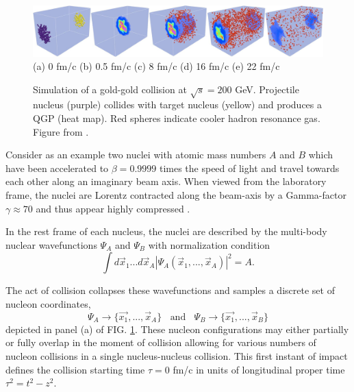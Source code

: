 \documentclass[aps,prc,reprint,amsmath,nofootinbib]{revtex4-1}
\begin{document}
\begin{figure}
  \centering
  \includegraphics[width=\textwidth]{evolution} \\
  (a) 0 fm/c   \hspace{.1\textwidth}
  (b) 0.5 fm/c \hspace{.1\textwidth}
  (c) 8 fm/c   \hspace{.1\textwidth}
  (d) 16 fm/c  \hspace{.1\textwidth}
  (e) 22 fm/c
  \caption{Simulation of a gold-gold collision at $\sqrt{s}=200$ GeV. Projectile nucleus (purple) collides with target nucleus (yellow) and produces a QGP (heat map). 
  Red spheres indicate cooler hadron resonance gas. Figure from \cite{iss}.}
  \label{fig:evolution}
\end{figure}

Consider as an example two nuclei with atomic mass numbers $A$ and $B$ which have been accelerated to $\beta=0.9999$ times the speed of light and travel towards
each other along an imaginary beam axis. When viewed from the laboratory frame, the nuclei are Lorentz contracted along the beam-axis by a Gamma-factor 
$\gamma \approx 70$ and thus appear highly compressed \cite{kolb}. 

In the rest frame of each nucleus, the nuclei are described by the multi-body nuclear wavefunctions $\Psi_{A}$ and $\Psi_{B}$ with normalization condition  
\begin{equation}
\int d\vec{x}_1 ... d\vec{x}_A \left | \Psi_A(\vec{x}_1,...,\vec{x}_A) \right|^2 = A.
\end{equation}

The act of collision collapses these wavefunctions and samples a discrete set of nucleon coordinates,
\begin{equation}
 \Psi_{A} \rightarrow \{\vec{x_1},...,\vec{x}_{A}\} ~~~~ \mbox{and} ~~~~ \Psi_{B} \rightarrow \{\vec{x_1},...,\vec{x}_{B}\}
\end{equation}
depicted in panel (a) of FIG. \ref{fig:evolution}. These nucleon configurations may either partially or fully overlap in the moment of collision allowing for various numbers of nucleon 
collisions in a single nucleus-nucleus collision. This first instant of impact defines the collision starting time $\tau=0$ fm/c in units of longitudinal proper time $\tau^2 = t^2-z^2$.
\end{document}
